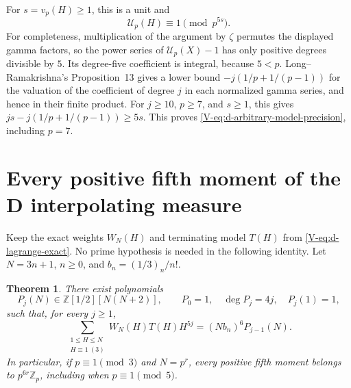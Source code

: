 \documentclass[11pt,letterpaper]{article}
\newtheorem{theorem}{Theorem}[section]
\numberwithin{equation}{section}
\begin{document}
For $s=v_p(H)\ge1$, this is a unit and
\begin{equation}\label{V-eq:d-arbitrary-model-precision}
 \mathcal U_p(H)\equiv1\pmod{p^{5s}}.
\end{equation}
For completeness, multiplication of the argument by $\zeta$
permutes the displayed gamma factors, so the power series of
$\mathcal U_p(X)-1$ has only positive degrees divisible by $5$.
Its degree-five coefficient is integral, because $5<p$.
Long--Ramakrishna's Proposition~13 gives a lower bound
$-j(1/p+1/(p-1))$ for the valuation of the coefficient of degree $j$
in each normalized gamma series, and hence in their finite product.
For $j\ge10$, $p\ge7$, and $s\ge1$, this gives
$js-j(1/p+1/(p-1))\ge5s$. This proves
\eqref{V-eq:d-arbitrary-model-precision}, including $p=7$.

\section{Every positive fifth moment of the D interpolating measure}\label{loc-V-5}
\label{V-sec:d-positive-moments}
Keep the exact weights $W_N(H)$ and terminating model $T(H)$ from
\eqref{V-eq:d-lagrange-exact}. No prime hypothesis is needed in the
following identity. Let $N=3n+1$, $n\ge0$, and $b_n=(1/3)_n/n!$.
\begin{theorem}\label{V-thm:d-positive-moments}
There exist polynomials
\[
 P_j(N)\in\mathbb Z[1/2][N(N+2)],\qquad
 P_0=1,\quad \deg P_j=4j,\quad P_j(1)=1,
\]
such that, for every $j\ge1$,
\[
 \boxed{\sum_{\substack{1\le H\le N\\H\equiv1\ (3)}}
 W_N(H)T(H)H^{5j}=(Nb_n)^6P_{j-1}(N).}
\]
In particular, if $p\equiv1\pmod3$ and $N=p^r$, every positive fifth
moment belongs to $p^{6r}\mathbb Z_p$, including when
$p\equiv1\pmod5$.
\end{theorem}
\end{document}
